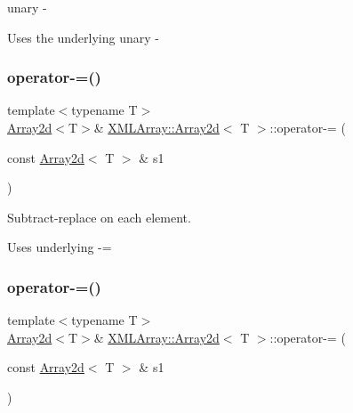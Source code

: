 unary -\/ 

Uses the underlying unary -\/ \mbox{\label{classXMLArray_1_1Array2d_aaeb259530dba3f189e129c935391d92a}} 
\subsubsection{\texorpdfstring{operator-\/=()}{operator-=()}\hspace{0.1cm}{\footnotesize\ttfamily [1/3]}}
{\footnotesize\ttfamily template$<$typename T$>$ \\
\mbox{\hyperlink{classXMLArray_1_1Array2d}{Array2d}}$<$T$>$\& \mbox{\hyperlink{classXMLArray_1_1Array2d}{X\+M\+L\+Array\+::\+Array2d}}$<$ T $>$\+::operator-\/= (\begin{DoxyParamCaption}\item[{const \mbox{\hyperlink{classXMLArray_1_1Array2d}{Array2d}}$<$ T $>$ \&}]{s1 }\end{DoxyParamCaption})\hspace{0.3cm}{\ttfamily [inline]}}



Subtract-\/replace on each element. 

Uses underlying -\/= \mbox{\label{classXMLArray_1_1Array2d_aaeb259530dba3f189e129c935391d92a}} 
\subsubsection{\texorpdfstring{operator-\/=()}{operator-=()}\hspace{0.1cm}{\footnotesize\ttfamily [2/3]}}
{\footnotesize\ttfamily template$<$typename T$>$ \\
\mbox{\hyperlink{classXMLArray_1_1Array2d}{Array2d}}$<$T$>$\& \mbox{\hyperlink{classXMLArray_1_1Array2d}{X\+M\+L\+Array\+::\+Array2d}}$<$ T $>$\+::operator-\/= (\begin{DoxyParamCaption}\item[{const \mbox{\hyperlink{classXMLArray_1_1Array2d}{Array2d}}$<$ T $>$ \&}]{s1 }\end{DoxyParamCaption})\hspace{0.3cm}{\ttfamily [inline]}}



